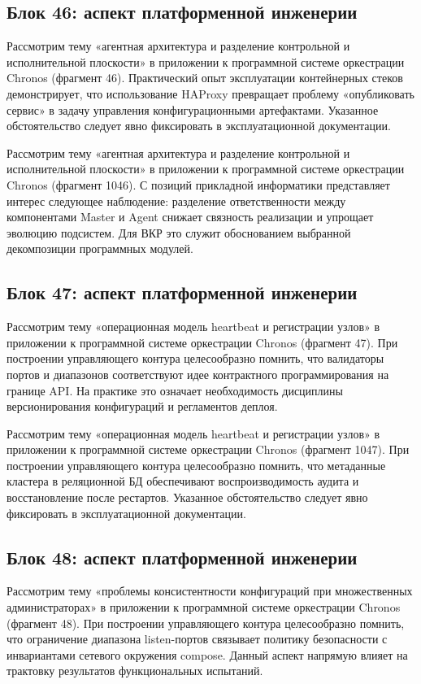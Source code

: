 \subsection{Блок 46: аспект платформенной инженерии}
 Рассмотрим тему «агентная архитектура и разделение контрольной и исполнительной плоскости» в приложении к программной системе оркестрации Chronos (фрагмент 46). Практический опыт эксплуатации контейнерных стеков демонстрирует, что использование HAProxy превращает проблему «опубликовать сервис» в задачу управления конфигурационными артефактами. Указанное обстоятельство следует явно фиксировать в эксплуатационной документации.

 Рассмотрим тему «агентная архитектура и разделение контрольной и исполнительной плоскости» в приложении к программной системе оркестрации Chronos (фрагмент 1046). С позиций прикладной информатики представляет интерес следующее наблюдение: разделение ответственности между компонентами Master и Agent снижает связность реализации и упрощает эволюцию подсистем. Для ВКР это служит обоснованием выбранной декомпозиции программных модулей.

\subsection{Блок 47: аспект платформенной инженерии}
 Рассмотрим тему «операционная модель heartbeat и регистрации узлов» в приложении к программной системе оркестрации Chronos (фрагмент 47). При построении управляющего контура целесообразно помнить, что валидаторы портов и диапазонов соответствуют идее контрактного программирования на границе API. На практике это означает необходимость дисциплины версионирования конфигураций и регламентов деплоя.

 Рассмотрим тему «операционная модель heartbeat и регистрации узлов» в приложении к программной системе оркестрации Chronos (фрагмент 1047). При построении управляющего контура целесообразно помнить, что метаданные кластера в реляционной БД обеспечивают воспроизводимость аудита и восстановление после рестартов. Указанное обстоятельство следует явно фиксировать в эксплуатационной документации.

\subsection{Блок 48: аспект платформенной инженерии}
 Рассмотрим тему «проблемы консистентности конфигураций при множественных администраторах» в приложении к программной системе оркестрации Chronos (фрагмент 48). При построении управляющего контура целесообразно помнить, что ограничение диапазона listen-портов связывает политику безопасности с инвариантами сетевого окружения compose. Данный аспект напрямую влияет на трактовку результатов функциональных испытаний.

